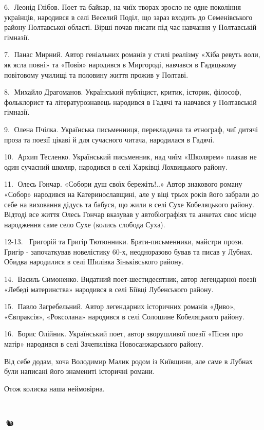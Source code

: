 6. 📒Леонід Глібов. Поет та байкар, на чиїх творах зросло не одне покоління
українців, народився в селі Веселий Поділ, що зараз входить до Семенівського
району Полтавської області. Вірші почав писати під час навчання у Полтавській
гімназії. 

7. 📗Панас Мирний. Автор геніальних романів у стилі реалізму «Хіба ревуть воли,
як ясла повні» та «Повія» народився в Миргороді, навчався в Гадяцькому
повітовому училищі та половину життя прожив у Полтаві. 

8. 📙Михайло Драгоманов. Український публіцист, критик, історик, філософ,
фольклорист та літературознавець народився в Гадячі та навчався у Полтавській
гімназії. 

9.📘 Олена Пчілка. Українська письменниця, перекладачка та етнограф, чиї дитячі
проза та поезії цікаві й для сучасного читача, народилася в Гадячі.  

10. 📙Архип Тесленко. Український письменник, над чиїм «Школярем» плакав не
один сучасний школяр, народився в селі Харківці Лохвицького району. 

11.📗 Олесь Гончар. «Собори душ своїх бережіть!..» Автор знакового роману
«Собор» народився на Катеринославщині, але у віці трьох років його забрали до
себе на виховання дідусь та бабуся, що жили в селі Сухе Кобеляцького району.
Відтоді все життя Олесь Гончар вказував у автобіографіях та анкетах своє місце
народження саме село Сухе (колись слобода Суха). 

12-13. 📘📒Григорій та Григір Тютюнники. Брати-письменники, майстри прози.
Григір - започаткував новелістику 60-х, неодноразово бував та писав у Лубнах.
Обидва народилися в селі Шилівка Зіньківського району. 

14. 📕Василь Симоненко. Видатний поет-шестидесятник, автор легендарної поезії
«Лебеді материнства» народився в селі Біївці Лубенського району. 

15. 📙Павло Загребельний. Автор легендарних історичних романів «Диво»,
«Євпраксія», «Роксолана» народився в селі Солошине Кобеляцького району. 

16.📘 Борис Олійник. Український поет, автор зворушливої поезії «Пісня про
матір» народився в селі Зачепилівка Новосанжарського району.

Від себе додам, хоча Володимир Малик родом із Київщини, але саме в Лубнах були
написані його знамениті історичні романи.

Отож колиска наша неймовірна.

 🌺🌺🌺🌺🌺🌺🌺

💚🐿

